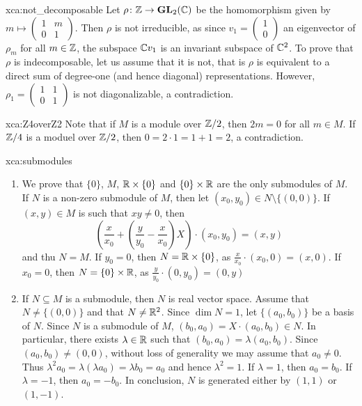 \begin{sol}{xca:not_decomposable}
    Let $\rho\colon \mathbb{Z}\to\mathbf{GL}_2(\mathbb{C})$ be the homomorphism given by 
    $m\mapsto\begin{pmatrix}1&m\\0&1\end{pmatrix}$. Then $\rho$ is not irreducible, as
    since $v_1=\begin{pmatrix}1\\0\end{pmatrix}$
    an eigenvector of $\rho_m$ for all $m\in\mathbb{Z}$, 
    the subspace $\mathbb{C} v_1$ is an invariant subspace of $\mathbb{C}^2$. To prove that $\rho$ is 
    indecomposable, let us assume that 
    it is not, that is $\rho$ is equivalent to a direct sum of degree-one (and hence diagonal) 
    representations. However, $\rho_1=\begin{pmatrix}1&1\\0&1\end{pmatrix}$ is not diagonalizable, 
    a contradiction. 
\end{sol}



\begin{sol}{xca:Z4overZ2}
	Note that if $M$ is a module over $\mathbb{Z}/2$, then $2m=0$ 
	for all $m\in M$.  If
	$\mathbb{Z}/4$ is a moduel over $\mathbb{Z}/2$, 
	then $0=2\cdot 1=1+1=2$, a contradiction. 
\end{sol}

\begin{sol}{xca:submodules}
    \begin{enumerate}
        \item We prove that $\{0\}$, $M$, $\mathbb{R}\times\{0\}$ and $\{0\}\times\mathbb{R}$ are
        the only submodules of $M$. If $N$ is a non-zero submodule of $M$, then
        let $(x_0,y_0)\in N\setminus\{(0,0)\}$. If $(x,y)\in M$ is such that $xy\ne 0$, then
        \[
            \left(\frac{x}{x_0}+\left(\frac{y}{y_0}-\frac{x}{x_0}\right)X\right)\cdot (x_0,y_0)=(x,y) 
        \]
        and thu $N=M$. If $y_0=0$, then $N=\mathbb{R}\times\{0\}$, as $\frac{x}{x_0}\cdot (x_0,0)=(x,0)$. If $x_0=0$, then
        $N=\{0\}\times\mathbb{R}$, as 
        $\frac{y}{y_0}\cdot (0,y_0)=(0,y)$ 
            \item If $N\subseteq M$ is a submodule, then $N$ is real vector space. Assume that 
            $N\ne\{(0,0)\}$ and that $N\ne\mathbb{R}^2$. Since $\dim N=1$, 
            let $\{(a_0,b_0)\}$ be a basis of $N$. Since $N$ is a submodule of $M$, 
            $(b_0,a_0)=X\cdot (a_0,b_0)\in N$. In particular, there exists 
            $\lambda\in\mathbb{R}$ such that $(b_0,a_0)=\lambda (a_0,b_0)$. Since $(a_0,b_0)\ne(0,0)$, 
            without loss of generality we may assume that 
            $a_0\ne 0$. Thus 
            $\lambda^2 a_0=\lambda (\lambda a_0)=\lambda b_0=a_0$ and hence
            $\lambda^2=1$. If $\lambda=1$, then 
            $a_0=b_0$. If $\lambda=-1$, then $a_0=-b_0$. In conclusion, $N$ 
            is generated either by $(1,1)$ or $(1,-1)$.  
    \end{enumerate}
\end{sol}


